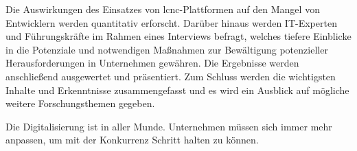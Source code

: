 Die Auswirkungen des Einsatzes von \ac{lcnc}-Plattformen auf den Mangel von Entwicklern werden quantitativ erforscht. Darüber hinaus werden IT-Experten und Führungskräfte im Rahmen eines Interviews befragt, welches tiefere Einblicke in die Potenziale und notwendigen Maßnahmen zur Bewältigung potenzieller Herausforderungen in Unternehmen gewähren. Die Ergebnisse werden anschließend ausgewertet und präsentiert. Zum Schluss werden die wichtigsten Inhalte und Erkenntnisse zusammengefasst und es wird ein Ausblick auf mögliche weitere Forschungsthemen gegeben.

\addtocounter{subsubsection}{1}

Die Digitalisierung ist in aller Munde. Unternehmen müssen sich immer mehr anpassen, um mit der Konkurrenz Schritt halten zu können.
